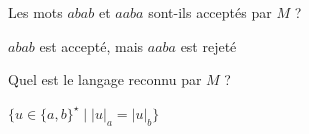 \begin{exercice}
  \begin{question}
  \item Les mots $abab$ et $aaba$ sont-ils acceptés par $M$ ? 
  \end{question}
  \begin{correction}
    $abab$ est accepté,  mais $aaba$ est rejeté
  \end{correction}
  
  \begin{question}
  \item Quel est le langage reconnu par $M$ ? 
  \end{question}
  \begin{correction}
    $\{u \in \{a, b\}^\star \mid |u|_a = |u|_b \}$
  \end{correction}

\end{exercice}

\endgroup
\endinput
